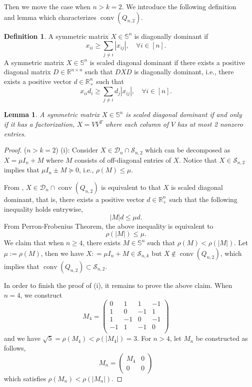 \documentclass[11pt]{amsart}
\newcommand{\Szero}[2]{\ensuremath{\mathcal{S}_{#1,#2}}}
\theoremstyle{plain}
\newtheorem{lem}{Lemma}[section]
\theoremstyle{definition}
\newtheorem{dfn}[thm]{Definition}
\theoremstyle{remark}
\newcommand{\RR}{\mathbb{R}}
\renewcommand{\SS}{{\mathbb{S}}}
\DeclareMathOperator{\conv}{conv}
\begin{document}
\begin{appendices}
		Then we move the case when \(n>k=2\). We introduce the following definition and lemma which characterizes \(\conv(Q_{n,2})\).
		\begin{dfn}
			A symmetric matrix \(X \in \SS^n\) is diagonally dominant if 
			\[
			x_{ii} \geq \sum_{j\neq i}|x_{ij}|,\quad\forall i\in [n].
			\]
			A symmetric matrix \(X\in \SS^n\) is scaled diagonal dominant if there exists a positive diagonal matrix \(D\in\RR^{n\times n}\) such that \(DXD\) is diagonally dominant, i.e., there exists a positive vector $d\in\RR^n_+$ such that
			\[
			x_{ii}d_i \geq  \sum_{j\neq i}d_j|x_{ij}|,\quad\forall i\in [n].
			\]
		\end{dfn}
		
		\begin{lem}\label{lem:sdd_factorization}
			A symmetric matrix \(X\in \SS^n\) is scaled diagonal dominant if and only if it has a factorization, \(X = VV^T\) where each column of $V$ has at most 2 nonzero entries.
		\end{lem}
		
		\begin{proof} (\(n>k=2\))
			(i): Consider \(X\in \mathcal{D}_n\cap \Szero{n}{2}\) which can be decomposed as \(X  = \mu I_n + M\) where $M$ consists of off-diagonal entries of \(X\).  Notice that \(X\in\Szero{n}{2}\) implies that \(\mu I_n \pm M \succeq 0\), i.e., \(\rho(M) \leq \mu\).
			
			From , \(X\in \mathcal{D}_n\cap \conv(Q_{n,2})\) is equivalent to that \(X\) is scaled diagonal dominant, that is, there exists a positive vector \(d\in\RR^n_+\) such that the following inequality holds entrywise,
			\[
			|M|d \leq \mu d. 
			\]
			From Perron-Frobenius Theorem, the above inequality is equivalent to
			\[
			\rho(|M|) \leq \mu.
			\]
			We claim that when $n\geq 4$, there exists \(M\in\SS^n\) such that \(\rho(M) < \rho(|M|)\). Let $\mu:= \rho(M)$, then we have \(X: = \mu I_n + M \in \Szero{n}{k}\) but \(X \notin \conv(Q_{n,2})\), which implies that \(\conv(Q_{n,2}) \subset \Szero{n}{2}\).
			
			In order to finish the proof of (i), it remains to prove the above claim. When \(n=4\), we construct 
			\[
			M_4 = \begin{pmatrix}
				0 & 1 & 1 & -1\\
				1 & 0 & -1 & 1\\
				1 & -1 & 0 & -1\\
				-1 & 1 & -1 & 0\\
			\end{pmatrix}
			\]
			and we have \(\sqrt{5} = \rho(M_4)<\rho(|M_4|) = 3\). For \(n>4\), let \(M_n\) be constructed as follows,
			\[
			M_n = \begin{pmatrix}
				M_4&0\\
				0&0
			\end{pmatrix}
			\]
			which satisfies \(\rho(M_n)<\rho(|M_n|)\).\qedhere
			

\end{proof}
\end{appendices}
\end{document}
